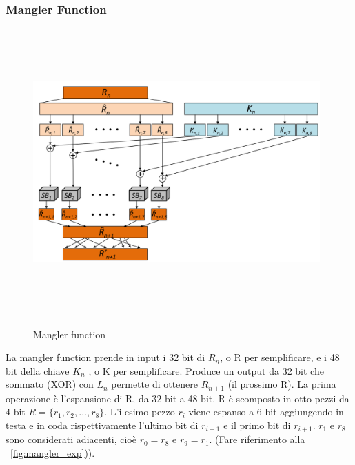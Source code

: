 \subsubsection{Mangler Function}
\begin{figure}[htbp]
	\centering%
	\subfigure%
	{\includegraphics[height=11cm, width=11cm, keepaspectratio]{Immagini/chiave_segreta/mangler.png}}
	\caption{Mangler function \label{fig:mangler}} 	
\end{figure}
La mangler function prende in input i 32 bit di $R_{n}$, o R per semplificare, e i 48 bit della chiave $K_{n}$ , o K per semplificare. Produce un output da 32 bit che sommato (XOR) con $L_{n}$ permette di ottenere $R_{n+1}$ (il prossimo R).\newline
La prima operazione è l’espansione di R, da 32 bit a 48 bit. R è scomposto in otto pezzi da 4 bit $R = \lbrace r_{1} , r_{2}, ..., r_{8} \rbrace$. L’i-esimo pezzo $r_{i}$ viene espanso a 6 bit aggiungendo in testa e in coda rispettivamente l’ultimo bit di $r_{i-1}$ e il primo bit di $r_{i+1}$. $r_{1}$ e $r_{8}$ sono considerati adiacenti, cioè $r_{0} = r_{8}$ e $r_{9} = r_{1}$. (Fare riferimento alla \figurename ~\ref{fig:mangler_exp})).
